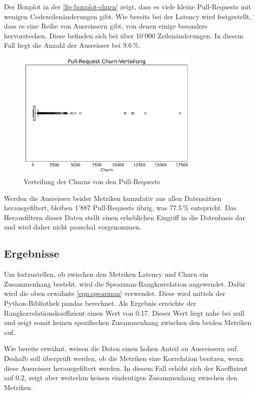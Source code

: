 Der Boxplot in der \autoref{fig:boxplot-churn} zeigt, dass es viele kleine Pull-Requests mit wenigen Codezeilenänderungen gibt. Wie bereits bei der Latency wird festgestellt, dass es eine Reihe von Ausreissern gibt, von denen einige besonders hervorstechen. Diese befinden sich bei über 10'000 Zeilenänderungen. In diesem Fall liegt die Anzahl der Ausreisser bei 9.6\,\%.

\begin{figure}[htbp]
    \includegraphics[width=0.8\textwidth]{Figures/boxplot-churn.pdf}
      \centering
    \caption{Verteilung der Churns von den Pull-Requests}
    \label{fig:boxplot-churn}
\end{figure}

Werden die Ausreisser beider Metriken kumulativ aus allen Datensätzen herausgefiltert, bleiben 1'887 Pull-Requests übrig, was 77.5\,\% entspricht. Das Herausfiltern dieser Daten stellt einen erheblichen Eingriff in die Datenbasis dar und wird daher nicht pauschal vorgenommen.

\subsection{Ergebnisse}
Um festzustellen, ob zwischen den Metriken Latency und Churn ein Zusammenhang besteht, wird die Spearman-Rangkorrelation angewendet. Dafür wird die oben erwähnte \autoref{eqn:spearman} verwendet. Diese wird mittels der Python-Bibliothek pandas berechnet. Als Ergebnis erreichte der Rangkorrelationskoeffizient einen Wert von 0.17. Dieser Wert liegt nahe bei null und zeigt somit keinen spezifischen Zusammenhang zwischen den beiden Metriken auf. 

Wie bereits erwähnt, weisen die Daten einen hohen Anteil an Ausreissern auf. Deshalb soll überprüft werden, ob die Metriken eine Korrelation besitzen, wenn diese Ausreisser herausgefiltert werden. In diesem Fall erhöht sich der Koeffizient auf 0.2, zeigt aber weiterhin keinen eindeutigen Zusammenhang zwischen den Metriken.

